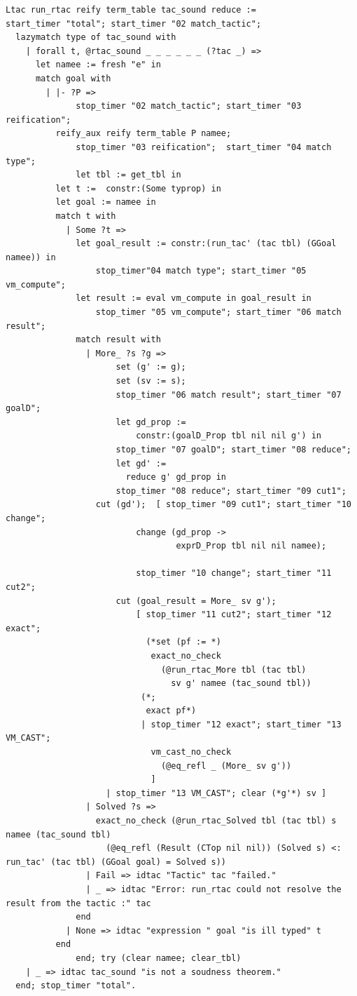 \documentclass{puthesis}
\begin{document}
\begin{lstlisting}
Ltac run_rtac reify term_table tac_sound reduce :=
start_timer "total"; start_timer "02 match_tactic";
  lazymatch type of tac_sound with
    | forall t, @rtac_sound _ _ _ _ _ _ (?tac _) =>
	  let namee := fresh "e" in
	  match goal with
	    | |- ?P => 
              stop_timer "02 match_tactic"; start_timer "03 reification";
	      reify_aux reify term_table P namee;
              stop_timer "03 reification";  start_timer "04 match type";
              let tbl := get_tbl in
	      let t :=  constr:(Some typrop) in
	      let goal := namee in
	      match t with
	        | Some ?t =>
	          let goal_result := constr:(run_tac' (tac tbl) (GGoal namee)) in
                  stop_timer"04 match type"; start_timer "05 vm_compute";
	          let result := eval vm_compute in goal_result in
                  stop_timer "05 vm_compute"; start_timer "06 match result";
	          match result with
	            | More_ ?s ?g =>
                      set (g' := g);
                      set (sv := s);
                      stop_timer "06 match result"; start_timer "07 goalD";
                      let gd_prop := 
                          constr:(goalD_Prop tbl nil nil g') in
                      stop_timer "07 goalD"; start_timer "08 reduce";
                      let gd' := 
                        reduce g' gd_prop in
                      stop_timer "08 reduce"; start_timer "09 cut1";
	              cut (gd');  [ stop_timer "09 cut1"; start_timer "10 change";
                          change (gd_prop -> 
                                  exprD_Prop tbl nil nil namee);

                          stop_timer "10 change"; start_timer "11 cut2";
	                  cut (goal_result = More_ sv g');
                          [ stop_timer "11 cut2"; start_timer "12 exact"; 
                            (*set (pf := *)
                             exact_no_check
                               (@run_rtac_More tbl (tac tbl) 
                                 sv g' namee (tac_sound tbl))
                           (*;
                            exact pf*)
                           | stop_timer "12 exact"; start_timer "13 VM_CAST"; 
                             vm_cast_no_check 
                               (@eq_refl _ (More_ sv g'))
                             ] 
	                | stop_timer "13 VM_CAST"; clear (*g'*) sv ]
	            | Solved ?s =>
	              exact_no_check (@run_rtac_Solved tbl (tac tbl) s namee (tac_sound tbl) 
	                (@eq_refl (Result (CTop nil nil)) (Solved s) <: run_tac' (tac tbl) (GGoal goal) = Solved s))
	            | Fail => idtac "Tactic" tac "failed."
	            | _ => idtac "Error: run_rtac could not resolve the result from the tactic :" tac
	          end
	        | None => idtac "expression " goal "is ill typed" t
	      end
              end; try (clear namee; clear_tbl)
	| _ => idtac tac_sound "is not a soudness theorem."
  end; stop_timer "total".
\end{lstlisting}
\end{document}
